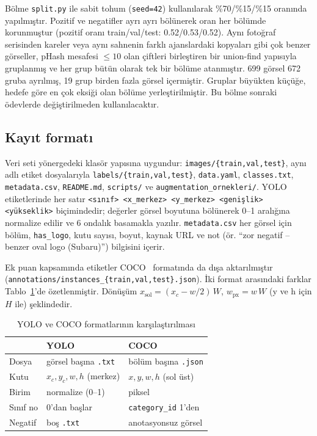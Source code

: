\documentclass[conference]{IEEEtran}
\newcommand{\kod}[1]{\texttt{\small #1}}
\begin{document}
Bölme \kod{split.py} ile sabit tohum (\kod{seed=42}) kullanılarak \%70/\%15/\%15 oranında
yapılmıştır. Pozitif ve negatifler ayrı ayrı bölünerek oran her bölümde korunmuştur
(pozitif oranı train/val/test: 0.52/0.53/0.52). Aynı fotoğraf serisinden kareler veya aynı
sahnenin farklı ajanslardaki kopyaları gibi çok benzer görseller, pHash mesafesi $\le 10$ olan
çiftleri birleştiren bir union-find yapısıyla gruplanmış ve her grup bütün olarak tek bir
bölüme atanmıştır. 699 görsel 672 gruba ayrılmış, 19 grup birden fazla görsel içermiştir.
Gruplar büyükten küçüğe, hedefe göre en çok eksiği olan bölüme yerleştirilmiştir. Bu bölme
sonraki ödevlerde değiştirilmeden kullanılacaktır.

\subsection{Kayıt formatı}

Veri seti yönergedeki klasör yapısına uygundur: \kod{images/\{train,val,test\}},
aynı adlı etiket dosyalarıyla \kod{labels/\{train,val,test\}}, \kod{data.yaml},
\kod{classes.txt}, \kod{metadata.csv}, \kod{README.md}, \kod{scripts/} ve
\kod{augmentation\_ornekleri/}. YOLO etiketlerinde her satır
\kod{<sınıf> <x\_merkez> <y\_merkez> <genişlik> <yükseklik>} biçimindedir; değerler görsel
boyutuna bölünerek 0--1 aralığına normalize edilir ve 6 ondalık basamakla yazılır.
\kod{metadata.csv} her görsel için bölüm, \kod{has\_logo}, kutu sayısı, boyut, kaynak URL ve
not (ör. ``zor negatif -- benzer oval logo (Subaru)'') bilgisini içerir.

Ek puan kapsamında etiketler COCO~\cite{coco} formatında da dışa aktarılmıştır
(\kod{annotations/instances\_\{train,val,test\}.json}). İki format arasındaki farklar
Tablo~\ref{tab:format}'de özetlenmiştir. Dönüşüm
$x_{\text{sol}} = (x_c - w/2)\,W$, $w_{\text{px}} = w\,W$ (y ve h için $H$ ile) şeklindedir.

\begin{table}[t]
\centering
\caption{YOLO ve COCO formatlarının karşılaştırılması}
\label{tab:format}
\begin{tabular}{@{}lll@{}}
\toprule
 & YOLO & COCO \\
\midrule
Dosya & görsel başına \kod{.txt} & bölüm başına \kod{.json} \\
Kutu & $x_c, y_c, w, h$ (merkez) & $x, y, w, h$ (sol üst) \\
Birim & normalize (0--1) & piksel \\
Sınıf no & 0'dan başlar & \kod{category\_id} 1'den \\
Negatif & boş \kod{.txt} & anotasyonsuz görsel \\
\bottomrule
\end{tabular}
\end{table}
\end{document}
